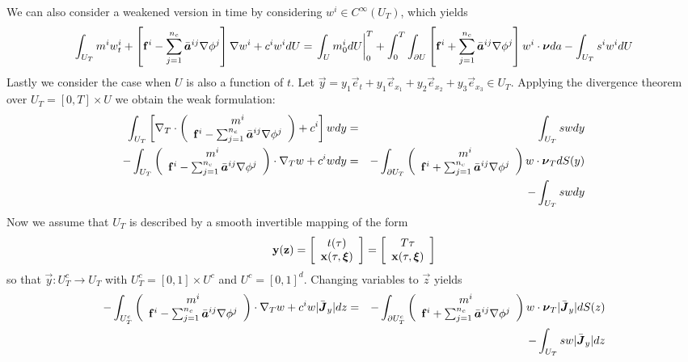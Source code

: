 \documentclass[10pt,dvips,twoside,reqno]{amsart}
\begin{document}
We can also consider a weakened version in time by considering $w^i \in
C^{\infty}(U_T)$, which yields
\begin{equation}
  \label{eq:weakSpaceTime}
  \int_{U_T} m^i w^i_t + \left[ {\bf f}^i - \sum_{j=1}^{n_c} \bar{\mbox{{\boldmath ${a}$}}}^{ij} \nabla \phi^j \right] \nabla w^i + c^iw^i dU = \left. \int_{U} m^i_0 dU \right|_0^T+\int_0^T \int_{\partial U} \left[ {\bf f}^i + \sum_{j=1}^{n_c} \bar{\mbox{{\boldmath ${a}$}}}^{ij} \nabla \phi^j \right] w^i \cdot \mbox{{\boldmath ${\nu}$}} da - \int_{U_T} s^iw^i dU 
\end{equation}
Lastly we consider the case when $U$ is also a function of $t$.  Let
$\vec y = y_1 \vec e_t + y_1 \vec e_{x_1} + y_2 \vec e_{x_2} + y_3
\vec e_{x_3} \in U_T$. Applying the divergence theorem over $U_T =
[0,T] \times U$ we obtain the weak formulation:
\begin{eqnarray}
    \int_{U_T} \left[ \nabla_T \cdot \left( \begin{array}{c} m^i \\ {\bf f}^i - \sum_{j=1}^{n_c} \bar{\mbox{{\boldmath ${a}$}}}^{ij} \nabla \phi^j \end{array} \right) + c^i \right] w dy &=& \int_{U_T} sw dy \\
    -\int_{U_T} \left( \begin{array}{c} m^i \\ {\bf f}^i - \sum_{j=1}^{n_c} \bar{\mbox{{\boldmath ${a}$}}}^{ij} \nabla \phi^j \end{array} \right) \cdot \nabla_T w + c^i w dy &=& -\int_{\partial U_T} \left( \begin{array}{c} m^i \\{\bf f}^i + \sum_{j=1}^{n_c} \bar{\mbox{{\boldmath ${a}$}}}^{ij} \nabla \phi^j \end{array} \right) w \cdot \mbox{{\boldmath ${\nu}$}}_T dS(y) \nonumber \\
&&- \int_{U_T} sw dy
\end{eqnarray}
Now we assume that $U_T$ is described by a smooth invertible
mapping of the form
\begin{equation}
{\bf y}({\bf z}) = \left[ \begin{array}{c} t(\tau) \\
{\bf x} (\tau, \mbox{{\boldmath ${\xi}$}})
\end{array}\right] = \left[ \begin{array}{c} T\tau \\
{\bf x} (\tau, \mbox{{\boldmath ${\xi}$}})
\end{array}\right]
\end{equation}
so that $\vec y: U^c_T \rightarrow U_T$ with $U^c_T = [0,1] \times U^c$ and $U^c = [0,1]^d$. Changing variables
to $\vec z$ yields
\begin{eqnarray}
-\int_{U^c_T} \left( \begin{array}{c} m^i \\ {\bf f}^i - \sum_{j=1}^{n_c} \bar{\mbox{{\boldmath ${a}$}}}^{ij} \nabla \phi^j \end{array} \right) \cdot \nabla_T w + c^i w |\bar{\mbox{{\boldmath ${J}$}}}_y| dz &=& -\int_{\partial U^c_T} \left( \begin{array}{c} m^i \\{\bf f}^i + \sum_{j=1}^{n_c} \bar{\mbox{{\boldmath ${a}$}}}^{ij} \nabla \phi^j \end{array} \right) w \cdot \mbox{{\boldmath ${\nu}$}}_T |\bar{\mbox{{\boldmath ${J}$}}}_y| dS(z) \nonumber \\
&&-  \int_{U_T} sw |\bar{\mbox{{\boldmath ${J}$}}}_y| dz
\end{eqnarray}
\end{document}
